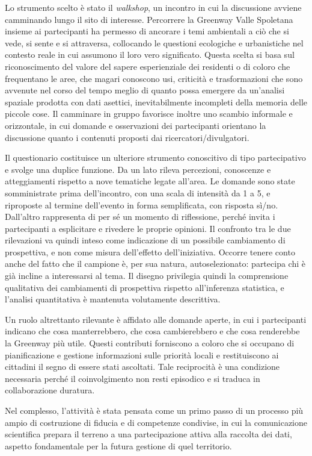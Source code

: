 \documentclass[
  a4paper,
]{book}
\begin{document}
Lo strumento scelto è stato il \emph{walkshop}, un incontro in cui la discussione avviene camminando lungo il sito di interesse.
Percorrere la Greenway Valle Spoletana insieme ai partecipanti ha permesso di ancorare i temi ambientali a ciò che si vede, si sente e si attraversa, collocando le questioni ecologiche e urbanistiche nel contesto reale in cui assumono il loro vero significato.
Questa scelta si basa sul riconoscimento del valore del sapere esperienziale dei residenti o di coloro che frequentano le aree, che magari conoscono usi, criticità e trasformazioni che sono avvenute nel corso del tempo meglio di quanto possa emergere da un'analisi spaziale prodotta con dati asettici, inevitabilmente incompleti della memoria delle piccole cose.
Il camminare in gruppo favorisce inoltre uno scambio informale e orizzontale, in cui domande e osservazioni dei partecipanti orientano la discussione quanto i contenuti proposti dai ricercatori/divulgatori.

Il questionario costituisce un ulteriore strumento conoscitivo di tipo partecipativo e svolge una duplice funzione.
Da un lato rileva percezioni, conoscenze e atteggiamenti rispetto a nove tematiche legate all'area.
Le domande sono state somministrate prima dell'incontro, con una scala di intensità da 1 a 5, e riproposte al termine dell'evento in forma semplificata, con risposta sì/no.
Dall'altro rappresenta di per sé un momento di riflessione, perché invita i partecipanti a esplicitare e rivedere le proprie opinioni.
Il confronto tra le due rilevazioni va quindi inteso come indicazione di un possibile cambiamento di prospettiva, e non come misura dell'effetto dell'iniziativa.
Occorre tenere conto anche del fatto che il campione è, per sua natura, autoselezionato: partecipa chi è già incline a interessarsi al tema. Il disegno privilegia quindi la comprensione qualitativa dei cambiamenti di prospettiva rispetto all'inferenza statistica, e l'analisi quantitativa è mantenuta volutamente descrittiva.

Un ruolo altrettanto rilevante è affidato alle domande aperte, in cui i partecipanti indicano che cosa manterrebbero, che cosa cambierebbero e che cosa renderebbe la Greenway più utile.
Questi contributi forniscono a coloro che si occupano di pianificazione e gestione informazioni sulle priorità locali e restituiscono ai cittadini il segno di essere stati ascoltati.
Tale reciprocità è una condizione necessaria perché il coinvolgimento non resti episodico e si traduca in collaborazione duratura.

Nel complesso, l'attività è stata pensata come un primo passo di un processo più ampio di costruzione di fiducia e di competenze condivise, in cui la comunicazione scientifica prepara il terreno a una partecipazione attiva alla raccolta dei dati, aspetto fondamentale per la futura gestione di quel territorio.
\end{document}
